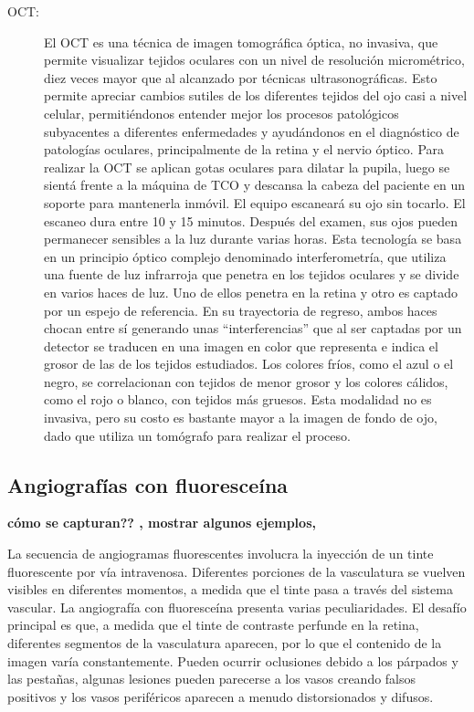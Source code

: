 \begin{description}
\item[OCT:] El OCT es una técnica de imagen tomográfica óptica, no invasiva, que permite visualizar tejidos oculares con un nivel de resolución micrométrico, diez veces mayor que al alcanzado por técnicas ultrasonográficas. Esto permite apreciar cambios sutiles de los diferentes tejidos del ojo casi a nivel celular, permitiéndonos entender mejor los procesos patológicos subyacentes a diferentes enfermedades y ayudándonos en el diagnóstico de patologías oculares, principalmente de la retina y el nervio óptico. Para realizar la OCT se aplican  gotas oculares para dilatar la pupila, luego se sientá frente a la máquina de TCO y descansa  la cabeza del paciente en un soporte para mantenerla inmóvil. El equipo escaneará su ojo sin tocarlo. El escaneo dura entre 10 y 15 minutos. Después del examen, sus ojos pueden permanecer sensibles a la luz durante varias horas. Esta tecnología se basa en un principio óptico complejo denominado interferometría, que utiliza una fuente de luz infrarroja que penetra en los tejidos oculares y se divide en varios haces de luz. Uno de ellos penetra en la retina y otro es captado por un espejo de referencia. En su trayectoria de regreso, ambos haces chocan entre sí generando unas “interferencias” que al ser captadas por un detector se traducen en una imagen en color que representa e indica el grosor de las de los tejidos estudiados. Los colores fríos, como el azul o el negro, se correlacionan con tejidos de menor grosor y los colores cálidos, como el rojo o blanco, con tejidos más gruesos. 
Esta modalidad no es invasiva, pero su costo es bastante mayor a la imagen de fondo de ojo, dado que utiliza un tomógrafo para realizar el proceso.
\end{description}
	
	\subsection{Angiograf\'ias con fluoresce\'ina}


{\textbf{cómo se capturan?? , mostrar algunos ejemplos,}}
	
	La secuencia de angiogramas fluorescentes involucra la inyección de un tinte fluorescente por vía intravenosa. Diferentes porciones de la vasculatura se vuelven visibles en diferentes momentos, a medida que el tinte pasa a través del sistema vascular.
La angiografía con fluoresceína presenta varias peculiaridades. El desafío principal es que, a medida que el tinte de contraste  perfunde en la retina, diferentes segmentos de la vasculatura aparecen, por lo que el contenido de la imagen varía constantemente.
Pueden ocurrir oclusiones debido a los párpados y las pestañas, algunas lesiones pueden parecerse a los vasos creando falsos positivos y los vasos periféricos aparecen a menudo distorsionados y difusos. \cite{perez2011improving}

